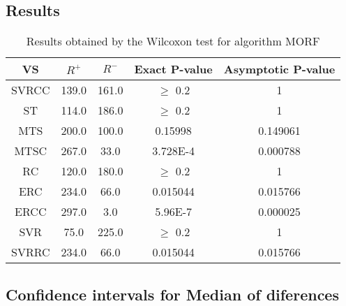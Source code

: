 \documentclass[a4paper,10pt]{article}
\begin{document}
\subsection{Results}

\begin{table}[!htp]
\centering\small
\begin{tabular}{
|c|c|c|c|c|}
\hline
 VS & $R^{+}$ & $R^{-}$ & Exact P-value & Asymptotic P-value \\ \hline 
SVRCC & 139.0 & 161.0 & $\geq$ 0.2 & 1\\ \hline 
ST & 114.0 & 186.0 & $\geq$ 0.2 & 1\\ \hline 
MTS & 200.0 & 100.0 & 0.15998 & 0.149061\\ \hline 
MTSC & 267.0 & 33.0 & 3.728E-4 & 0.000788\\ \hline 
RC & 120.0 & 180.0 & $\geq$ 0.2 & 1\\ \hline 
ERC & 234.0 & 66.0 & 0.015044 & 0.015766\\ \hline 
ERCC & 297.0 & 3.0 & 5.96E-7 & 0.000025\\ \hline 
SVR & 75.0 & 225.0 & $\geq$ 0.2 & 1\\ \hline 
SVRRC & 234.0 & 66.0 & 0.015044 & 0.015766\\ \hline 

\end{tabular}
\caption{Results obtained by the Wilcoxon test for algorithm MORF}
\end{table}

\subsection{Confidence intervals for Median of diferences}
\end{document}
